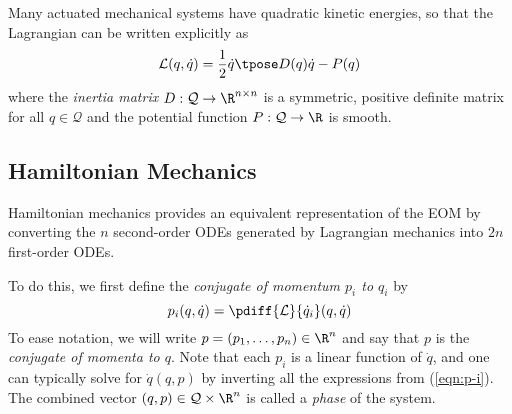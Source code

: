 Many actuated mechanical systems have quadratic kinetic energies, so that the
Lagrangian can be written explicitly as
\begin{equation}\label{eqn:lagrangian}
    \mathcal{L}(q,\dot{q}) = \frac{1}{2} \dot{q}\tpose D(q) \dot{q} - P(q)
\end{equation}
where the \textit{inertia matrix} \(D: \mathcal{Q} \rightarrow \R^{n\times n}\) 
is a symmetric, positive definite matrix for all \(q \in \mathcal{Q}\) and the
potential function \(P : \mathcal{Q} \rightarrow \R\) is smooth. 

\subsection{Hamiltonian Mechanics}
Hamiltonian mechanics provides an equivalent representation of the EOM
by converting the \(n\) second-order ODEs generated by Lagrangian mechanics into
\(2n\) first-order ODEs.

To do this, we first define the \textit{conjugate of momentum \(p_i\) to \(q_i\)} by
\begin{equation}\label{eqn:p-i}
    p_i(q,\dot{q}) = \pdiff{\mathcal{L}}{\dot{q}_i}(q,\dot{q})
\end{equation}
To ease notation, we will write \(p = (p_1, \ldots, p_n) \in \R^n\) and say that
\(p\) is the \textit{conjugate of momenta to \(q\)}.
Note that each \(p_i\) is a linear function of \(\dot{q}\), and one can typically
solve for \(\dot{q}(q,p)\) by inverting all the expressions from (\ref{eqn:p-i}).
The combined vector \((q,p) \in \mathcal{Q}\times\R^n\) is called a 
\textit{phase} of the system. 

